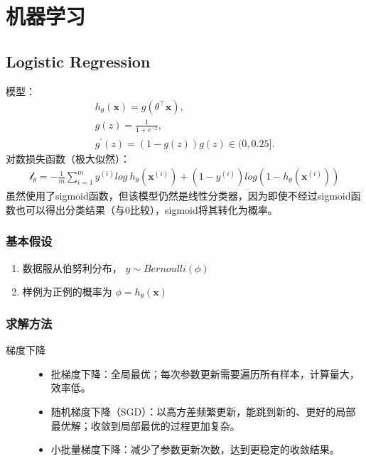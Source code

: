 \documentclass[letterpaper,10pt,english]{sphinxmanual}
\begin{document}
\chapter{机器学习}
\label{\detokenize{machineLearning/index::doc}}\label{\detokenize{machineLearning/index:id1}}

\section{Logistic Regression}
\label{\detokenize{machineLearning/01_lr:logistic-regression}}\label{\detokenize{machineLearning/01_lr::doc}}
模型：
\begin{equation*}
\begin{split}h_\theta(\mathbf{x}) = g(\theta^\top \mathbf{x}),\\
g(z) = \frac{1}{1+e^{-z}},\\
g^\prime(z) = (1-g(z))g(z) \in (0, 0.25].\end{split}
\end{equation*}
对数损失函数（极大似然）：
\begin{equation*}
\begin{split}\mathcal{l}_\theta = -\frac{1}{m} \sum_{i=1}^m y^{(i)}log\  h_\theta(\mathbf{x}^{(i)}) + (1 - y^{(i)})log(1 - h_\theta(\mathbf{x}^{(i)}))\end{split}
\end{equation*}
虽然使用了sigmoid函数，但该模型仍然是线性分类器，因为即使不经过sigmoid函数也可以得出分类结果（与0比较），sigmoid将其转化为概率。


\subsection{基本假设}
\label{\detokenize{machineLearning/01_lr:id1}}\begin{enumerate}
\item {} 
数据服从伯努利分布， \(y \sim Bernoulli(\phi)\)

\item {} 
样例为正例的概率为 \(\phi=h_\theta(\mathbf{x})\)

\end{enumerate}


\subsection{求解方法}
\label{\detokenize{machineLearning/01_lr:id2}}\begin{description}
\item[{梯度下降}] \leavevmode\begin{itemize}
\item {} 
批梯度下降：全局最优；每次参数更新需要遍历所有样本，计算量大，效率低。

\item {} 
随机梯度下降（SGD）：以高方差频繁更新，能跳到新的、更好的局部最优解；收敛到局部最优的过程更加复杂。

\item {} 
小批量梯度下降：减少了参数更新次数，达到更稳定的收敛结果。

\end{itemize}

\end{description}
\end{document}
